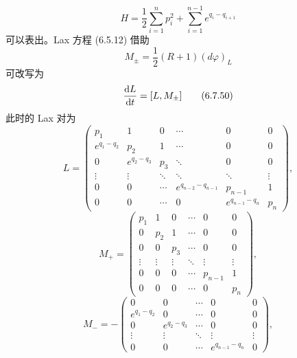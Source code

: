 \begin{equation}
  H = \frac{1}{2}\sum_{i=1}^{n}p_i^2 + \sum_{i=1}^{n-1}e^{q_i-q_{i+1}}
  \tag{6.7.48}
\end{equation}
可以表出。Lax 方程 (6.5.12) 借助
\begin{equation}
  M_\pm = \frac{1}{2}(R+1)(d\varphi)_L
  \tag{6.7.49}
\end{equation}
可改写为
\begin{equation}
  \frac{\mathrm{d} L}{\mathrm{d} t} = [L,M_\pm]
  \tag{6.7.50}
\end{equation}
此时的 Lax 对为
\begin{equation}
  L = \begin{pmatrix}
    p_1&1&0&\cdots&0&0\\
    e^{q_1-q_2}&p_2&1&\cdots&0&0\\
    0&e^{q_2-q_3}&p_3&\ddots&0&0\\
    \vdots&\vdots&\ddots&\ddots&\ddots&\vdots\\
    0&0&\cdots&e^{q_{n-2}-q_{n-1}}&p_{n-1}&1\\
    0&0&\cdots&0&e^{q_{n-1}-q_n}&p_n
  \end{pmatrix},
  \tag{6.7.51}
\end{equation}
\begin{equation}
  M_+ = \begin{pmatrix}
    p_1&1&0&\cdots&0&0\\
    0&p_2&1&\cdots&0&0\\
    0&0&p_3&\cdots&0&0\\
    \vdots&\vdots&\vdots&\ddots&\vdots&\vdots\\
    0&0&0&\cdots&p_{n-1}&1\\
    0&0&0&\cdots&0&p_n
  \end{pmatrix},
  \tag{6.7.52}
\end{equation}
\begin{equation}
  M_- = -\begin{pmatrix}
    0&0&\cdots&0&0\\
    e^{q_1-q_2}&0&\cdots&0&0\\
    0&e^{q_2-q_3}&\cdots&0&0\\
    \vdots&\vdots&\ddots&\vdots&\vdots\\
    0&0&\cdots&e^{q_{n-1}-q_n}&0
  \end{pmatrix},
  \tag{6.7.53}
\end{equation}

